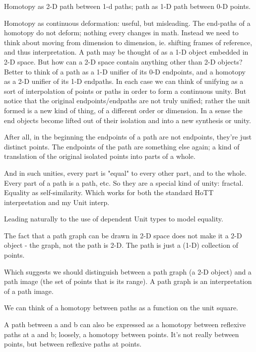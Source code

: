 \documentclass{article}
\begin{document}
Homotopy as 2-D path between 1-d paths; path as 1-D path between 0-D
points.

Homotopy as continuous deformation: useful, but misleading.  The
end-paths of a homotopy do not deform; nothing every changes in math.
Instead we need to think about moving from dimension to dimension,
ie. shifting frames of reference, and thus interpretation.  A path may
be thought of as a 1-D object embedded in 2-D space.  But how can a
2-D space contain anything other than 2-D objects?  Better to think of
a path as a 1-D unifier of its 0-D endpoints, and a homotopy as a 2-D
unifier of its 1-D endpaths.  In each case we can think of unifying as
a sort of interpolation of points or paths in order to form a
continuous unity. But notice that the original endpoints/endpaths are
not truly unified; rather the unit formed is a new kind of thing, of a
different order or dimension.  In a sense the end objects become
lifted out of their isolation and into a new synthesis or unity.

After all, in the beginning the endpoints of a path are not endpoints,
they're just distinct points.  The endpoints of the path are something
else again; a kind of translation of the original isolated points into
parts of a whole.

And in such unities, every part is "equal" to every other part, and to
the whole.  Every part of a path is a path, etc.  So they are a
special kind of unity: fractal.  Equality as self-similarity.  Which
works for both the standard HoTT interpretation and my Unit interp.

Leading naturally to the use of dependent Unit types to model equality.

The fact that a path graph can be drawn in 2-D space does not make it
a 2-D object - the graph, not the path is 2-D.  The path is just a
(1-D) collection of points.

Which suggests we should distinguish between a path graph (a 2-D
object) and a path image (the set of points that is its range).  A
path graph is an interpretation of a path image.

We can think of a homotopy between paths as a function on the unit
square.

A path between a and b can also be expressed as a homotopy between
reflexive paths at a and b; loosely, a homotopy between points.  It's
not really between points, but between reflexive paths at points.
\end{document}

